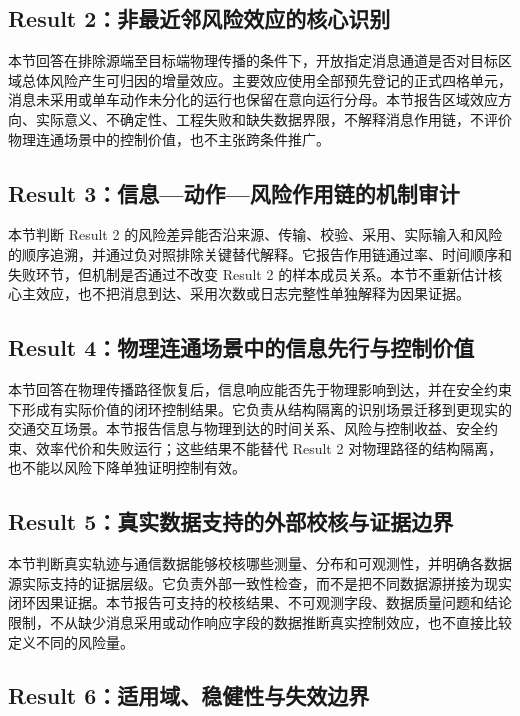 \documentclass[10pt,a4paper,twocolumn]{article}
\begin{document}
\subsection*{Result 2：非最近邻风险效应的核心识别}

本节回答在排除源端至目标端物理传播的条件下，开放指定消息通道是否对目标区域总体风险产生可归因的增量效应。主要效应使用全部预先登记的正式四格单元，消息未采用或单车动作未分化的运行也保留在意向运行分母。本节报告区域效应方向、实际意义、不确定性、工程失败和缺失数据界限，不解释消息作用链，不评价物理连通场景中的控制价值，也不主张跨条件推广。

\subsection*{Result 3：信息—动作—风险作用链的机制审计}

本节判断 Result 2 的风险差异能否沿来源、传输、校验、采用、实际输入和风险的顺序追溯，并通过负对照排除关键替代解释。它报告作用链通过率、时间顺序和失败环节，但机制是否通过不改变 Result 2 的样本成员关系。本节不重新估计核心主效应，也不把消息到达、采用次数或日志完整性单独解释为因果证据。

\subsection*{Result 4：物理连通场景中的信息先行与控制价值}

本节回答在物理传播路径恢复后，信息响应能否先于物理影响到达，并在安全约束下形成有实际价值的闭环控制结果。它负责从结构隔离的识别场景迁移到更现实的交通交互场景。本节报告信息与物理到达的时间关系、风险与控制收益、安全约束、效率代价和失败运行；这些结果不能替代 Result 2 对物理路径的结构隔离，也不能以风险下降单独证明控制有效。

\subsection*{Result 5：真实数据支持的外部校核与证据边界}

本节判断真实轨迹与通信数据能够校核哪些测量、分布和可观测性，并明确各数据源实际支持的证据层级。它负责外部一致性检查，而不是把不同数据源拼接为现实闭环因果证据。本节报告可支持的校核结果、不可观测字段、数据质量问题和结论限制，不从缺少消息采用或动作响应字段的数据推断真实控制效应，也不直接比较定义不同的风险量。

\subsection*{Result 6：适用域、稳健性与失效边界}
\end{document}

